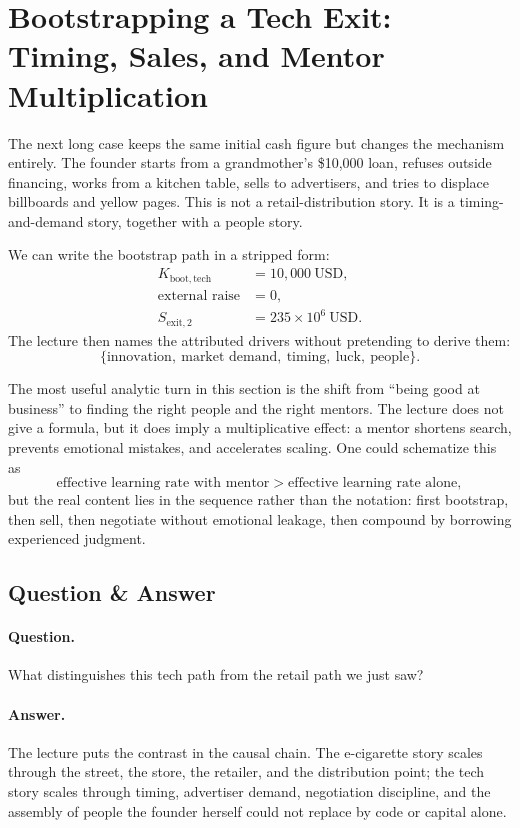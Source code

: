 \section{Bootstrapping a Tech Exit: Timing, Sales, and Mentor Multiplication}

The next long case keeps the same initial cash figure but changes the mechanism entirely. The founder starts from a grandmother's \$10{,}000 loan, refuses outside financing, works from a kitchen table, sells to advertisers, and tries to displace billboards and yellow pages. This is not a retail-distribution story. It is a timing-and-demand story, together with a people story.

We can write the bootstrap path in a stripped form:
\begin{align}
K_{\mathrm{boot,tech}} &= 10{,}000\ \mathrm{USD},\\
\text{external raise} &= 0,\\
S_{\mathrm{exit},2} &= 235\times 10^{6}\ \mathrm{USD}.
\end{align}
The lecture then names the attributed drivers without pretending to derive them:
\[
\{\text{innovation},\ \text{market demand},\ \text{timing},\ \text{luck},\ \text{people}\}.
\]

The most useful analytic turn in this section is the shift from ``being good at business'' to finding the right people and the right mentors. The lecture does not give a formula, but it does imply a multiplicative effect: a mentor shortens search, prevents emotional mistakes, and accelerates scaling. One could schematize this as
\begin{equation}
\text{effective learning rate with mentor}>\text{effective learning rate alone},
\end{equation}
but the real content lies in the sequence rather than the notation: first bootstrap, then sell, then negotiate without emotional leakage, then compound by borrowing experienced judgment.

\subsection{Question \& Answer}

\paragraph{Question.} What distinguishes this tech path from the retail path we just saw?

\paragraph{Answer.} The lecture puts the contrast in the causal chain. The e-cigarette story scales through the street, the store, the retailer, and the distribution point; the tech story scales through timing, advertiser demand, negotiation discipline, and the assembly of people the founder herself could not replace by code or capital alone.

